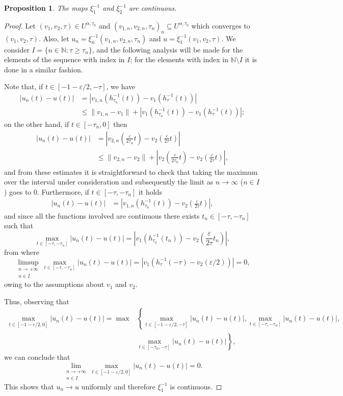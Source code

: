 \documentclass[a4paper,11pt]{article}
\theoremstyle{plain}
\newtheorem{prop}[thm]{Proposition}
\theoremstyle{definition}
\theoremstyle{definition}
\newcommand{\N}{\mathbb{N}}
\numberwithin{equation}{section}
\begin{document}
\begin{prop}
    The maps $\xi_1^{-1}$ and $\xi_2^{-1}$ are continuous.
\end{prop}
\begin{proof}
Let $(v_1,v_2,\tau)\in U^{\alpha,\tau_0}$ and $(v_{1,n},v_{2,n},\tau_n)_n \subseteq U^{\alpha,\tau_0}$ which converges to $(v_1,v_2,\tau)$. Also, let $u_n=\xi_n^{-1}(v_{1,n},v_{2,n},\tau_n)$ and $u=\xi_1^{-1}(v_1,v_2,\tau)$. We consider $I= \{ n\in\N \colon \tau\geq \tau_n \}$, and the following analysis will be made for the elements of the sequence with index in $I$; for the elements with index in $\N\setminus I$ it is done in a similar fashion.

Note that, if $t\in[-1-\varepsilon/2,-\tau]$, we have
\begin{align*}
    |u_n(t) - u(t)| &= |v_{1,n}(h_{\tau_n}^{-1}(t)) - v_1(h_\tau^{-1}(t))| \\
    &\leq \|v_{1,n}-v_1\| + | v_1(h_{\tau_n}^{-1}(t)) - v_1(h_\tau^{-1}(t)) |;
\end{align*}
on the other hand, if $t\in[-\tau_n,0]$ then
\begin{align*}
    |u_n(t) - u(t)| &= \left| v_{2,n}\left( \frac{\varepsilon}{2\tau_n} t \right) - v_2\left( \frac{\varepsilon}{2\tau} t\right) \right| \\
    &\leq \| v_{2,n} - v_2 \| + \left| v_2\left( \frac{\varepsilon}{2\tau_n}t \right) - v_2\left( \frac{\varepsilon}{2\tau} t \right) \right|,
\end{align*}
and from these estimates it is straightforward to check that taking the maximum over the interval under consideration and subsequently the limit as $n\to \infty$ ($n\in I$) goes to 0. Furthermore, if $t\in[-\tau,-\tau_n]$ it holds
\begin{align*}
    |u_n(t)- u(t)| & = \left| v_{1,n}(h_{\tau_n}^{-1}(t)) - v_2\left( \frac{\varepsilon}{2\tau} t \right) \right|,
\end{align*}
and since all the functions involved are continuous there exists $t_n\in[-\tau,-\tau_n]$ such that
\[
    \max_{t\in[-\tau,-\tau_n]} |u_n(t) - u(t)| = \left|v_1(h_{\tau_n}^{-1}(t_n)) - v_2\left( \frac{\varepsilon}{2\tau} t_n \right) \right|,
\]
from where
\[
    \limsup_{\substack{n\to +\infty \\ n\in I}}\max_{t\in[-\tau,-\tau_n]} |u_n(t) - u(t)| = \left| v_1(h_{\tau}^{-1}(-\tau) - v_2(\varepsilon/2)) \right| = 0,
\]
owing to the assumptions about $v_1$ and $v_2$.

Thus, observing that
\begin{align*}
    \max_{t\in[-1-\varepsilon/2,0]} |u_n(t)-u(t)| = \max & \left\{ \max_{t\in[-1-\varepsilon/2,-\tau]} |u_n(t)-u(t)| , \max_{t\in[-\tau,-\tau_n]} |u_n(t)-u(t)|, \right. \\
    & \left. \max_{t\in[-\tau_n,-\tau]} |u_n(t)-u(t)| \right\},
\end{align*}
we can conclude that
\[
    \lim_{\substack{n\to +\infty \\ n\in I}}\max_{t\in[-1-\varepsilon/2,0]} |u_n(t) - u(t)| = 0.
\]
This shows that $u_n \to u$ uniformly and therefore $\xi_1^{-1}$ is continuous.


\end{proof}
\end{document}
